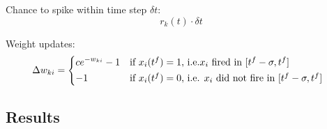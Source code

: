 Chance to spike within time step $\delta t$:
\begin{equation}
\label{eqn:rkdt}
r_k(t) \cdot \delta t
\end{equation}

Weight updates:
\begin{equation}
\label{deltawki}
\Delta w_{ki} = \begin{dcases*} ce^{-w_{ki}} - 1 & if $x_{i}(t^f) = 1$, i.e.$x_{i}$ fired in $ [t^f - \sigma, t^f] $ \\
-1 & \text{if $ x_i(t^f) = 0 $, i.e. $ x_i $ did not fire in $ [t^f - \sigma, t^f] $ } \end{dcases*}
\end{equation}

\subsection{Results}
